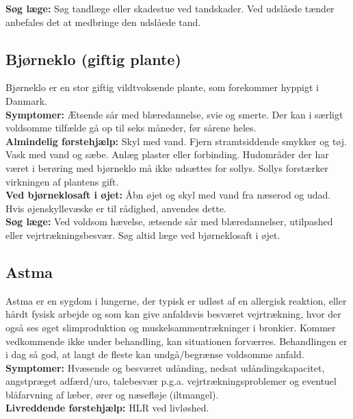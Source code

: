 \documentclass[../../../main.tex]{subfiles}
\begin{document}
\begin{multicols}{2}
\textbf{Søg læge:} Søg tandlæge eller skadestue ved tandskader. Ved udslåede tænder anbefales det at medbringe den udslåede tand. 
\\
\subsection*{Bjørneklo (giftig plante)} Bjørneklo er en stor giftig vildtvoksende plante, som forekommer hyppigt i Danmark.
\\

\textbf{Symptomer:} Ætsende sår med blæredannelse, svie og smerte. Der kan i særligt voldsomme tilfælde gå op til seks måneder, før sårene heles.
\\

\textbf{Almindelig førstehjælp:} Skyl med vand. Fjern stramtsiddende smykker og
tøj. Vask med vand og sæbe. Anlæg plaster eller
forbinding. Hudområder der har været i berøring med bjørneklo må ikke udsættes for sollys. Sollys forstærker virkningen af plantens gift.
\\

\textbf{Ved bjørneklosaft i øjet:} Åbn øjet og skyl med vand fra næserod og udad. Hvis øjenskyllevæske er til rådighed, anvendes dette.
\\

\textbf{Søg læge:} Ved voldsom hævelse, ætsende sår med blæredannelser, utilpashed eller vejrtrækningsbesvær. Søg altid læge ved bjørneklosaft i øjet. 
\\

\subsection*{Astma} Astma er en sygdom i lungerne, der typisk er udløst af en allergisk reaktion, eller hårdt fysisk arbejde og som kan give anfaldsvis besværet vejrtrækning, hvor der også ses øget slimproduktion og muskelsammentrækninger i bronkier. Kommer vedkommende ikke under behandling, kan
situationen forværres. Behandlingen er i dag så god, at langt de fleste kan undgå/begrænse voldsomme anfald.
\\

\textbf{Symptomer:} Hvæsende og besværet udånding, nedsat udåndingskapacitet, angstpræget adfærd/uro, talebesvær p.g.a. vejrtrækningsproblemer og eventuel blåfarvning af læber, ører og næsefløje (iltmangel).
\\

\textbf{Livreddende førstehjælp:} HLR ved livløshed.
\\


\end{multicols}
\end{document}
